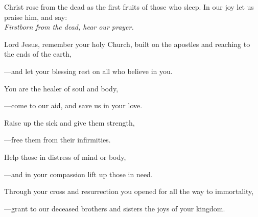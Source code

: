 \intercessions\indent

\begin{hangpar}

Christ rose from the dead as the first fruits of those who sleep. In our joy let us praise him, and say:\\
\emph{Firstborn from the dead, hear our prayer.}

\medskip Lord Jesus, remember your holy Church, built on the apostles and reaching to the ends of the earth,

{\color{red}---\thinspace}and let your blessing rest on all who believe in you.

\medskip You are the healer of soul and body,

{\color{red}---\thinspace}come to our aid, and save us in your love.

\medskip Raise up the sick and give them strength,

{\color{red}---\thinspace}free them from their infirmities.

\medskip Help those in distress of mind or body,

{\color{red}---\thinspace}and in your compassion lift up those in need.

\medskip Through your cross and resurrection you opened for all the way to immortality,

{\color{red}---\thinspace}grant to our deceased brothers and sisters the joys of your kingdom.

\end{hangpar}

